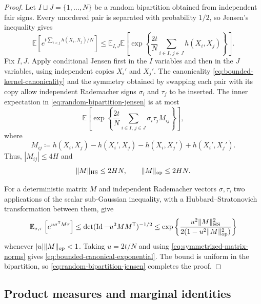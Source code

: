 \documentclass[11pt,reqno]{amsart}
\numberwithin{equation}{section}
\theoremstyle{plain}
\theoremstyle{definition}
\DeclarePairedDelimiter{\norm}{\lVert}{\rVert}
\newcommand{\E}{\mathbb E}
\newcommand{\Id}{\operatorname{Id}}
\newcommand{\HS}{\mathrm{HS}}
\newcommand{\op}{\mathrm{op}}
\begin{document}
\begin{proof}
Let $I\sqcup J=\{1,\ldots,N\}$ be a random bipartition obtained from independent fair signs.  Every unordered pair is separated with probability $1/2$, so Jensen's inequality gives
\begin{equation}
 \E\left[e^{t\sum_{i<j}h(X_i,X_j)/N}\right]
 \leq\E_{I,J}\E\left[
 \exp\left\{\frac{2t}{N}\sum_{i\in I,\,j\in J}h(X_i,X_j)\right\}\right].
 \label{eq:random-bipartition-jensen}
\end{equation}
Fix $I,J$.  Apply conditional Jensen first in the $I$ variables and then in the $J$ variables, using independent copies $X_i'$ and $X_j'$.  The canonicality \eqref{eq:bounded-kernel-canonicality} and the symmetry obtained by swapping each pair with its copy allow independent Rademacher signs $\sigma_i$ and $\tau_j$ to be inserted.  The inner expectation in \eqref{eq:random-bipartition-jensen} is at most
\begin{equation}
 \E\left[\exp\left\{\frac{2t}{N}
 \sum_{i\in I,\,j\in J}\sigma_i\tau_j M_{ij}\right\}\right],
 \label{eq:double-symmetrized-bilinear-form}
\end{equation}
where
\begin{equation}
 M_{ij}\coloneqq h(X_i,X_j)-h(X_i',X_j)-h(X_i,X_j')+h(X_i',X_j').
 \label{eq:symmetrized-matrix}
\end{equation}
Thus, $|M_{ij}|\leq4H$ and
\begin{equation}
 \norm{M}_{\HS}\leq2HN,
 \qquad
 \norm{M}_{\op}\leq2HN.
 \label{eq:symmetrized-matrix-norms}
\end{equation}

For a deterministic matrix $M$ and independent Rademacher vectors $\sigma,\tau$, two applications of the scalar sub-Gaussian inequality, with a Hubbard--Stratonovich transformation between them, give
\begin{equation}
 \E_{\sigma,\tau}\left[e^{u\sigma^{\mathsf T}M\tau}\right]
 \leq\det(\Id-u^2MM^{\mathsf T})^{-1/2}
 \leq\exp\left\{\frac{u^2\norm{M}_{\HS}^2}
 {2(1-u^2\norm{M}_{\op}^2)}\right\}
 \label{eq:bilinear-rademacher-bound}
\end{equation}
whenever $|u|\norm{M}_{\op}<1$.  Taking $u=2t/N$ and using \eqref{eq:symmetrized-matrix-norms} gives \eqref{eq:bounded-canonical-exponential}.  The bound is uniform in the bipartition, so \eqref{eq:random-bipartition-jensen} completes the proof.
\end{proof}

\subsection{Product measures and marginal identities}
\label{subsec:shared-marginal-preliminaries}
\end{document}
